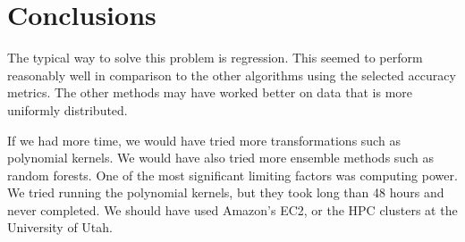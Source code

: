 \documentclass[pdftex,a4paper,11pt]{article}
\begin{document}
\section{Conclusions}
The typical way to solve this problem is regression.  This seemed to perform reasonably well in comparison to the other algorithms using the selected accuracy metrics. The other methods may have worked better on data that is more uniformly distributed.

If we had more time, we would have tried more transformations such as polynomial kernels. We would have also tried more ensemble methods such as random forests. One of the most significant limiting factors was computing power. We tried running the polynomial kernels, but they took long than 48 hours and never completed. We should have used Amazon's EC2, or the HPC clusters at the University of Utah.



\end{document}
